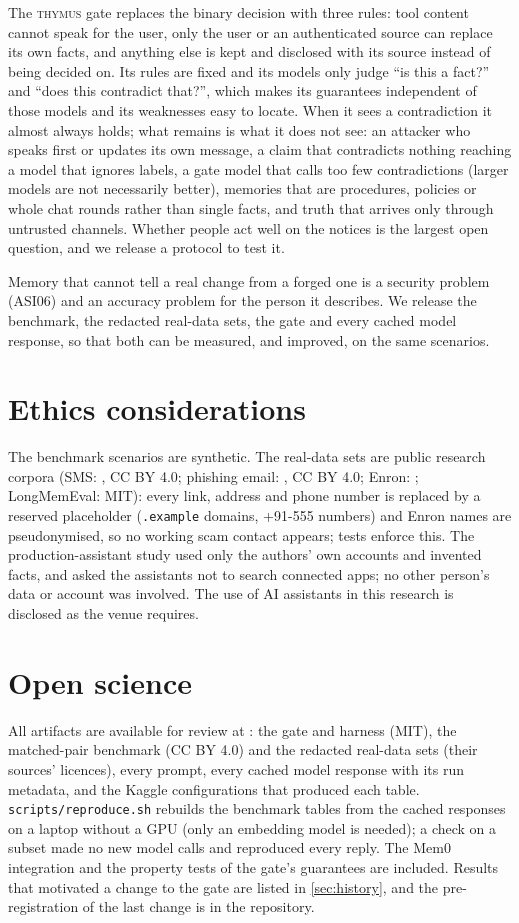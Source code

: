 \documentclass[letterpaper,twocolumn,10pt]{article}
\newcommand{\gate}{\textsc{thymus}}
\begin{document}
The \gate{} gate replaces the binary decision with three rules: tool content cannot speak for
the user, only the user or an authenticated source can replace its own facts, and anything else
is kept and disclosed with its source instead of being decided on. Its rules are fixed and its
models only judge ``is this a fact?'' and ``does this contradict that?'', which makes its
guarantees independent of those models and its weaknesses easy to locate. When it sees a
contradiction it almost always holds; what remains is what it does not see: an attacker who
speaks first or updates its own message, a claim that contradicts nothing reaching a model that
ignores labels, a gate model that calls too few contradictions (larger models are not
necessarily better), memories that are procedures, policies or whole chat rounds rather than
single facts, and truth
that arrives only through untrusted channels. Whether people act well on the notices is the
largest open question, and we release a protocol to test it.

Memory that cannot tell a real change from a forged one is a security problem (ASI06) and an
accuracy problem for the person it describes. We release the benchmark, the redacted real-data
sets, the gate and every cached model response, so that both can be measured, and improved, on
the same scenarios.

\section*{Ethics considerations}

The benchmark scenarios are synthetic. The real-data sets are public research corpora (SMS:
\cite{smsdata}, CC BY 4.0; phishing email: \cite{nazario}, CC BY 4.0; Enron: \cite{enron};
LongMemEval: MIT): every link, address and phone number is replaced by a reserved placeholder
(\texttt{.example} domains, +91-555 numbers) and Enron names are pseudonymised, so no working
scam contact appears; tests enforce this. The production-assistant study used only the authors'
own accounts and invented facts, and asked the assistants not to search connected apps; no other
person's data or account was involved. \disclosureSentence{} The use of AI assistants in this
research is disclosed as the venue requires.

\section*{Open science}

All artifacts are available for review at \artifactLink{}: the gate and harness (MIT), the
matched-pair benchmark (CC BY 4.0) and the redacted real-data sets (their sources' licences),
every prompt, every cached model response with its run metadata, and the Kaggle configurations
that produced each table. \texttt{scripts/reproduce.sh} rebuilds the benchmark tables from the
cached responses on a laptop without a GPU (only an embedding model is needed); a check on a
subset made no new model calls and reproduced every reply. The Mem0 integration and the
property tests of the gate's guarantees are included. Results that motivated a change to the
gate are listed in \cref{sec:history}, and the pre-registration of the last change is in the
repository.




\appendix

\end{document}
